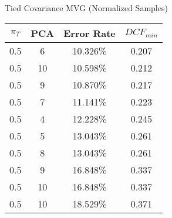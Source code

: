 \caption{Tied Covariance MVG (Normalized Samples)}\label{tab:mvgn_tiedcov}
\begin{center}
\begin{tabular}{|c|c|c|c|}
\hline
$\pi_T$ & PCA & Error Rate & $DCF_{min}$\\
\hline
0.5 & 6 & 10.326\% & 0.207\\
\hline
0.5 & 10 & 10.598\% & 0.212\\
\hline
0.5 & 9 & 10.870\% & 0.217\\
\hline
0.5 & 7 & 11.141\% & 0.223\\
\hline
0.5 & 4 & 12.228\% & 0.245\\
\hline
0.5 & 5 & 13.043\% & 0.261\\
\hline
0.5 & 8 & 13.043\% & 0.261\\
\hline
0.5 & 9 & 16.848\% & 0.337\\
\hline
0.5 & 10 & 16.848\% & 0.337\\
\hline
0.5 & 10 & 18.529\% & 0.371\\
\hline
\end{tabular}
\end{center}

